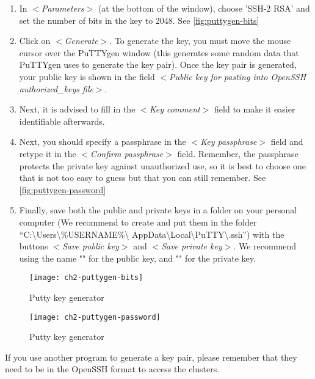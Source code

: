   \begin{enumerate}
    \item  In $<$\emph{Parameters}$>$ (at the bottom of the window), choose
      'SSH-2 RSA' and set the number of bits in the key to 2048. See \autoref{fig:puttygen-bits}
    \item  Click on $<$\emph{Generate}$>$. To generate the key, you must move
      the mouse cursor over the PuTTYgen window (this generates some random
      data that PuTTYgen uses to generate the key pair). Once the key pair is
      generated, your public key is shown in the field $<$\emph{Public key for pasting into OpenSSH authorized\_keys file}$>$.
    \item  Next, it is advised to fill in the $<$\emph{Key comment}$>$ field
      to make it easier identifiable afterwards.
    \item  Next, you should specify a passphrase in the $<$\emph{Key passphrase}$>$
      field and retype it in the $<$\emph{Confirm passphrase}$>$ field.
      Remember, the passphrase protects the private key against unauthorized
      use, so it is best to choose one that is not too easy to guess but that
      you can still remember. See \autoref{fig:puttygen-password}
    \item  Finally, save both the public and private keys in a folder on your
      personal computer (We recommend to create and put them in the folder
      ``C:\textbackslash Users\textbackslash \%USERNAME\%\textbackslash
      AppData\textbackslash Local\textbackslash PuTTY\textbackslash .ssh'')
      with the buttons $<$\emph{Save public key}$>$ and $<$\emph{Save private key}$>$.
      We recommend using the name "" for the public key,
      and "" for the private key.
  \end{enumerate}

  \begin{figure}
    \texttt{[image: ch2-puttygen-bits]}
    \caption{Putty key generator}
    \label{fig:puttygen-bits}
  \end{figure}

  \begin{figure}
    \texttt{[image: ch2-puttygen-password]}
    \caption{Putty key generator}
    \label{fig:puttygen-password}
  \end{figure}

  If you use another program to generate a key pair, please remember that they
  need to be in the OpenSSH format to access the \hpc clusters.

